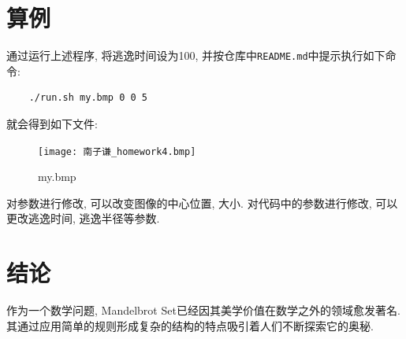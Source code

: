 \documentclass{ctexart}
\begin{document}
\section{算例}
通过运行上述程序, 将逃逸时间设为100, 并按仓库中\verb!README.md!中提示执行如下命令: 
\begin{verbatim}
    ./run.sh my.bmp 0 0 5
\end{verbatim}
\par 就会得到如下文件: 
\begin{figure}[!ht]
	\centering
	\texttt{[image: 南子谦\_homework4.bmp]}
	\caption{my.bmp}
\end{figure}
\par 对参数进行修改, 可以改变图像的中心位置, 大小. 对代码中的参数进行修改, 可以更改逃逸时间, 逃逸半径等参数.

\section{结论}
作为一个数学问题, Mandelbrot Set已经因其美学价值在数学之外的领域愈发著名. 其通过应用简单的规则形成复杂的结构的特点吸引着人们不断探索它的奥秘. 




\nocite{enwiki:1094796296}
\nocite{朱华2011分形理论及其应用}
\end{document}
